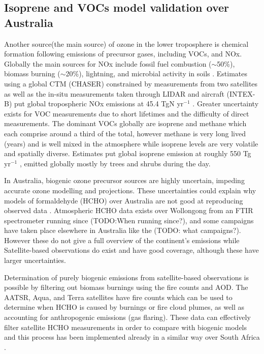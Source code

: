 \subsection{Isoprene and VOCs model validation over Australia}
Another source(the main source) of ozone in the lower troposphere is chemical formation following emissions of precursor gases, including VOCs, and NOx.
Globally the main sources for NOx include fossil fuel combustion ($\sim$50\%), biomass burning ($\sim$20\%), lightning, and microbial activity in soils \citep{Delmas_1997}.
Estimates using a global CTM (CHASER) constrained by measurements from two satellites as well as the in-situ measurements taken through LIDAR and aircraft (INTEX-B) put global tropospheric NOx emissions at 45.4 TgN yr$^{-1}$ \cite{Miyazaki_2011}. 
Greater uncertainty exists for VOC measurements due to short lifetimes and the difficulty of direct measurements.
The dominant VOCs globally are isoprene and methane which each comprise around a third of the total, however methane is very long lived (years) and is well mixed in the atmosphere while isoprene levels are very volatile and spatially diverse.
Estimates put global isoprene emission at roughly 550 Tg yr$^{-1}$ \cite{Guenther_2006, Monks_2014}, emitted globally mostly by trees and shrubs during the day.

In Australia, biogenic ozone precursor sources are highly uncertain, impeding accurate ozone modelling and projections. These uncertainties could explain why models of formaldehyde (HCHO) over Australia are not good at reproducing observed data \cite{Stavrakou_2009}. Atmospheric HCHO data exists over Wollongong from an FTIR spectrometer running since (TODO:When running since?), and some campaigns have taken place elsewhere in Australia like the (TODO: what campaigns?).
However these do not give a full overview of the continent's emissions while Satellite-based observations do exist and have good coverage, although these have larger uncertainties. 

Determination of purely biogenic emissions from satellite-based observations is possible by filtering out biomass burnings using the fire counts and AOD.
The AATSR, Aqua, and Terra satellites have fire counts which can be used to determine when HCHO is caused by burnings or fire cloud plumes, as well as accounting for anthropogenic emissions (gas flaring).
These data can effectively filter satellite HCHO measurements in order to compare with biogenic models and this process has been implemented already in a similar way over South Africa \cite{Marais_2012}.

